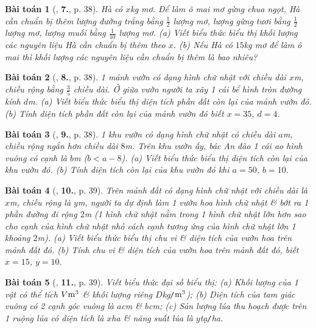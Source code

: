 \documentclass{article}
\numberwithin{equation}{section}
\newtheorem{baitoan}{Bài toán}
\begin{document}
\begin{baitoan}[\cite{SBT_Toan_7_Canh_Dieu_tap_2}, \textbf{7.}, p. 38]
	Hà có $x$\emph{kg} mơ. Để làm ô mai mơ gừng chua ngọt, Hà cần chuẩn bị thêm lượng đường trắng bằng $\frac{1}{2}$ lượng mơ, lượng gừng tươi bằng $\frac{1}{2}$ lượng mơ, lượng muối bằng $\frac{1}{10}$ lượng mơ. (a) Viết biểu thức biểu thị khối lượng các nguyên liệu Hà cần chuẩn bị thêm theo $x$. (b) Nếu Hà có $15$\emph{kg} mơ để làm ô mai thì khối lượng các nguyên liệu cần chuẩn bị thêm là bao nhiêu?
\end{baitoan}

\begin{baitoan}[\cite{SBT_Toan_7_Canh_Dieu_tap_2}, \textbf{8.}, p. 38]
	1 mảnh vườn có dạng hình chữ nhật với chiều dài $x$\emph{m}, chiều rộng bằng $\frac{3}{5}$ chiều dài. Ở giữa vườn người ta xây 1 cái bể hình tròn đường kính $d$\emph{m}. (a) Viết biểu thức biểu thị diện tích phần đất còn lại của mảnh vườn đó. (b) Tính diện tích phần đất còn lại của mảnh vườn đó biết $x = 35$, $d = 4$.
\end{baitoan}

\begin{baitoan}[\cite{SBT_Toan_7_Canh_Dieu_tap_2}, \textbf{9.}, p. 38]
	1 khu vườn có dạng hình chữ nhật có chiều dài $a$\emph{m}, chiều rộng ngắn hơn chiều dài $8$\emph{m}. Trên khu vườn ấy, bác An đào 1 cái ao hình vuông có cạnh là $b$\emph{m} ($b < a - 8$). (a) Viết biểu thức biểu thị diện tích còn lại của khu vườn đó. (b) Tính diện tích còn lại của khu vườn đó khi $a = 50$, $b = 10$.
\end{baitoan}

\begin{baitoan}[\cite{SBT_Toan_7_Canh_Dieu_tap_2}, \textbf{10.}, p. 39]
	Trên mảnh đất có dạng hình chữ nhật với chiều dài là $x$\emph{m}, chiều rộng là $y$\emph{m}, người ta dự định làm 1 vườn hoa hình chữ nhật \& bớt ra 1 phần đường đi rộng $2$\emph{m} (1 hình chữ nhật nằm trong 1 hình chữ nhật lớn hơn sao cho cạnh của hình chữ nhật nhỏ cách cạnh tương ứng của hình chữ nhật lớn 1 khoảng $2$\emph{m}). (a) Viết biểu thức biểu thị chu vi \& diện tích của vườn hoa trên mảnh đất đó. (b) Tính chu vi \& diện tích của vườn hoa trên mảnh đất đó, biết $x = 15$, $y = 10$.
\end{baitoan}

\begin{baitoan}[\cite{SBT_Toan_7_Canh_Dieu_tap_2}, \textbf{11.}, p. 39]
	Viết biểu thức đại số biểu thị: (a) Khối lượng của 1 vật có thể tích $V{\rm m}^3$ \& khối lượng riêng $D$\emph{kg\texttt{/}$\rm m^3$}); (b) Diện tích của tam giác vuông có 2 cạnh góc vuông là $a$\emph{cm} \& $b$\emph{cm}; (c) Sản lượng lúa thu hoạch được trên 1 ruộng lúa có diện tích là $x$\emph{ha} \& năng suất lúa là $y$\emph{tạ\texttt{/}ha}.
\end{baitoan}
\end{document}
